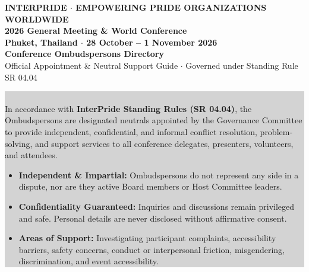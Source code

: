 \documentclass[10pt,a4paper]{article}
\begin{document}
\begin{center}
    {\footnotesize\bfseries\color{muted} INTERPRIDE $\cdot$ EMPOWERING PRIDE ORGANIZATIONS WORLDWIDE}\\[1.5mm]
    {\LARGE\bfseries\color{primary} 2026 General Meeting \& World Conference}\\[1mm]
    {\normalsize\color{secondary}\textbf{Phuket, Thailand $\cdot$ 28 October -- 1 November 2026}}\\[2.5mm]
    {\huge\bfseries\color{primary} Conference Ombudspersons Directory}\\[1.5mm]
    {\footnotesize\color{muted} Official Appointment \& Neutral Support Guide $\cdot$ Governed under Standing Rule SR 04.04}
\end{center}

\vspace{1.5mm}

\noindent
\colorbox{lightgray}{%
\parbox{\dimexpr\linewidth-2\fboxsep\relax}{%
    \vspace{1.5mm}
    \\[1mm]
    \footnotesize
    In accordance with \textbf{InterPride Standing Rules (SR 04.04)}, the Ombudspersons are designated neutrals appointed by the Governance Committee to provide independent, confidential, and informal conflict resolution, problem-solving, and support services to all conference delegates, presenters, volunteers, and attendees.
    \begin{itemize}
        \item \textbf{Independent \& Impartial:} Ombudspersons do not represent any side in a dispute, nor are they active Board members or Host Committee leaders.
        \item \textbf{Confidentiality Guaranteed:} Inquiries and discussions remain privileged and safe. Personal details are never disclosed without affirmative consent.
        \item \textbf{Areas of Support:} Investigating participant complaints, accessibility barriers, safety concerns, conduct or interpersonal friction, misgendering, discrimination, and event accessibility.
    \end{itemize}
    \vspace{0.5mm}
}}

\vspace{2mm}
\end{document}
